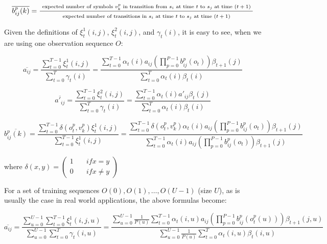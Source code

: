 \documentclass{article}[14pt, oneside, a4paper, times]
\begin{document}
\begin{equation}
\overline{b_{ij}^p(k)} =
    \frac{ \mbox{ \scriptsize{expected number of symbols $v_k^p$ in transition
                    from $s_i$ at time $t$ to $s_j$ at time $(t+1)$ }}}
         { \mbox{ \scriptsize{expected number of transitions in $s_i$
                    at time $t$ to $s_j$ at time $(t+1)$ }}}
    \label{EQ:b-1}
\end{equation}

Given the definitions of $\xi_t^1(i,j)$, $\xi_t^2(i,j)$, and $\gamma_t(i)$, it
is easy to see, when we are using one observation sequence $O$:

\begin{equation}
    \overline{a_{ij}} =
        \frac{ \sum_{t=0}^{T-1} \xi_t^1(i,j) } { \sum_{t=0}^T \gamma_t(i) } =
        \frac{ \sum_{t=0}^{T-1} \alpha_t(i) a_{ij} \left( \prod_{p=0}^{P-1} b_{ij}^p(o_t) \right) \beta_{t+1}(j) }
             { \sum_{t=0}^T \alpha_t(i) \beta_t(i) }
     \label{EQ:a-2}
\end{equation}

\begin{equation}
    \overline{a'_{ij}} =
        \frac{ \sum_{t=0}^{T-1} \xi_t^2(i,j) } { \sum_{t=0}^T \gamma_t(i) } =
        \frac{ \sum_{t=0}^{T-1} \alpha_t(i) a'_{ij} \beta_t(j) }
            { \sum_{t=0}^T \alpha_t(i) \beta_t(i) }
    \label{EQ:a2-2}
\end{equation}

\begin{equation}
    \overline{b_{ij}^p(k)} =
        \frac{ \sum_{t=0}^{T-1} \delta(o_t^p, v_k^p) \xi_t^1(i,j) }
             { \sum_{t=0}^{T-1} \xi_t^1(i,j) } =
        \frac{ \sum_{t=0}^{T-1} \delta(o_t^p, v_k^p) \alpha_t(i) a_{ij} \left( \prod_{p=0}^{P-1} b_{ij}^p(o_t) \right) \beta_{t+1}(j) }
             { \sum_{t=0}^{T-1} \alpha_t(i) a_{ij} \left( \prod_{p=0}^{P-1} b_{ij}^p(o_t) \right) \beta_{t+1}(j) }
    \label{EQ:b-2}
\end{equation}

\noindent where $\delta(x,y) = \left ( \begin{array} {cc}
                    1 & \quad if x = y \\
                    0 & \quad if x \ne y
                \end{array}\right)$

For a set of training sequences $O(0), O(1), \ldots, O(U-1)$ (size $U$), as is
usually the case in real world applications, the above formulas become:

\begin{equation}
    \overline{a_{ij}} =
        \frac{ \sum_{u=0}^{U-1} \sum_{t=0}^{T-1} \xi_t^1(i,j,u)}
             { \sum_{u=0}^{U-1} \sum_{t=0}^T \gamma_t(i,u)} =
        \frac{ \sum_{u=0}^{U-1} \frac{1} {P(u)} \sum_{t=0}^{T-1}
               \alpha_t(i,u) a_{ij} \left( \prod_{p=0}^{P-1} b_{ij}^p(o_t^p(u)) \right) \beta_{t+1}(j,u) }
             { \sum_{u=0}^{U-1} \frac{1} {P(u)} \sum_{t=0}^T \alpha_t(i,u) \beta_t(i,u) }
    \label{EQ:a-3}
\end{equation}
\end{document}
